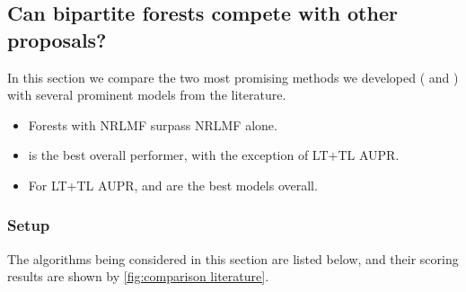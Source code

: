 \subsection{Can bipartite forests compete with other proposals?}
\label{sec:comparison literature}

In this section we compare the two most promising methods we developed ( and ) with several prominent models from the literature. 

\begin{mdframed}[frametitle={Key findings}]
    \begin{itemize}
        \item Forests with NRLMF surpass NRLMF alone.
        \item {} is the best overall performer, with the exception of LT+TL AUPR. 
        \item For LT+TL AUPR,  and  are the best models overall.
    \end{itemize}
\end{mdframed}

\subsubsection{Setup}

The algorithms being considered in this section are listed below, and their scoring results are shown by \autoref{fig:comparison literature}.

